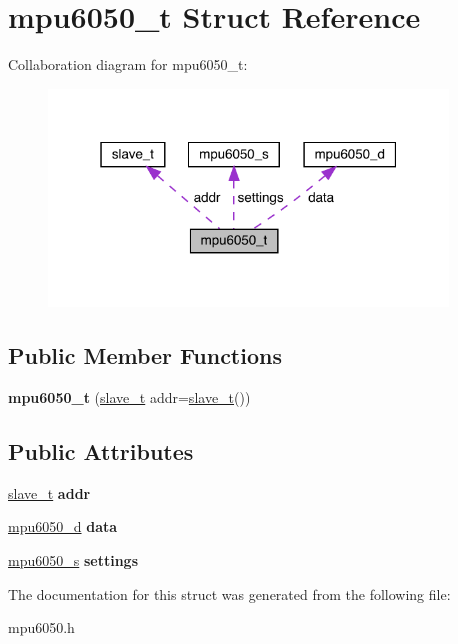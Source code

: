 \hypertarget{structmpu6050__t}{}\section{mpu6050\+\_\+t Struct Reference}
\label{structmpu6050__t}


Collaboration diagram for mpu6050\+\_\+t\+:\nopagebreak
\begin{figure}[H]
\begin{center}
\leavevmode
\includegraphics[width=301pt]{structmpu6050__t__coll__graph}
\end{center}
\end{figure}
\subsection*{Public Member Functions}
\begin{DoxyCompactItemize}
\item 
\mbox{\label{structmpu6050__t_ae66ee931655d40f389f45fa2bd652dbf}} 
{\bfseries mpu6050\+\_\+t} (\mbox{\hyperlink{structslave__t}{slave\+\_\+t}} addr=\mbox{\hyperlink{structslave__t}{slave\+\_\+t}}())
\end{DoxyCompactItemize}
\subsection*{Public Attributes}
\begin{DoxyCompactItemize}
\item 
\mbox{\label{structmpu6050__t_a61f3fb7626fd4df7fe919da15b61f400}} 
\mbox{\hyperlink{structslave__t}{slave\+\_\+t}} {\bfseries addr}
\item 
\mbox{\label{structmpu6050__t_ad9d6c6a1e71d62ebffdbf123aafe009e}} 
\mbox{\hyperlink{structmpu6050__d}{mpu6050\+\_\+d}} {\bfseries data}
\item 
\mbox{\label{structmpu6050__t_a185513b1c965c430645d75eecf5a401d}} 
\mbox{\hyperlink{structmpu6050__s}{mpu6050\+\_\+s}} {\bfseries settings}
\end{DoxyCompactItemize}


The documentation for this struct was generated from the following file\+:\begin{DoxyCompactItemize}
\item 
mpu6050.\+h\end{DoxyCompactItemize}
